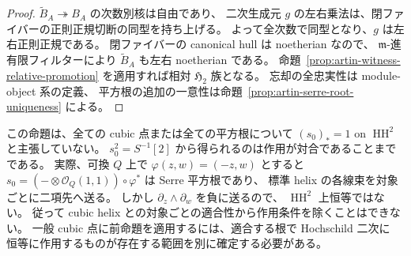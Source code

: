 \begin{proof}
$\widetilde B_A\twoheadrightarrow B_A$ の次数別核は自由であり、
二次生成元 $g$ の左右乗法は、閉ファイバーの正則正規切断の同型を持ち上げる。
よって全次数で同型となり、$g$ は左右正則正規である。
閉ファイバーの canonical hull は noetherian なので、
$\mathfrak m$-進有限フィルターにより $\widetilde B_A$ も左右 noetherian である。
命題~\ref{prop:artin-witness-relative-promotion} を適用すれば相対 $\mathfrak H_2$ 族となる。
忘却の全忠実性は module-object 系の定義、
平方根の追加の一意性は命題~\ref{prop:artin-serre-root-uniqueness} による。
\end{proof}

\begin{remark}
\label{rem:cubic-helix-root-action}
この命題は、全ての cubic 点または全ての平方根について
$(s_0)_*=1$ on $\operatorname{HH}^2$ と主張していない。
$s_0^2=S^{-1}[2]$ から得られるのは作用が対合であることまでである。
実際、可換 $Q$ 上で $\varphi(z,w)=(-z,w)$ とすると
$s_0=(-\otimes\mathcal O_Q(1,1))\circ\varphi^*$ は Serre 平方根であり、
標準 helix の各線束を対象ごとに二項先へ送る。
しかし $\partial_z\wedge\partial_w$ を負に送るので、
$\operatorname{HH}^2$ 上恒等ではない。
従って cubic helix との対象ごとの適合性から作用条件を除くことはできない。
一般 cubic 点に前命題を適用するには、適合する根で Hochschild 二次に
恒等に作用するものが存在する範囲を別に確定する必要がある。
\end{remark}
